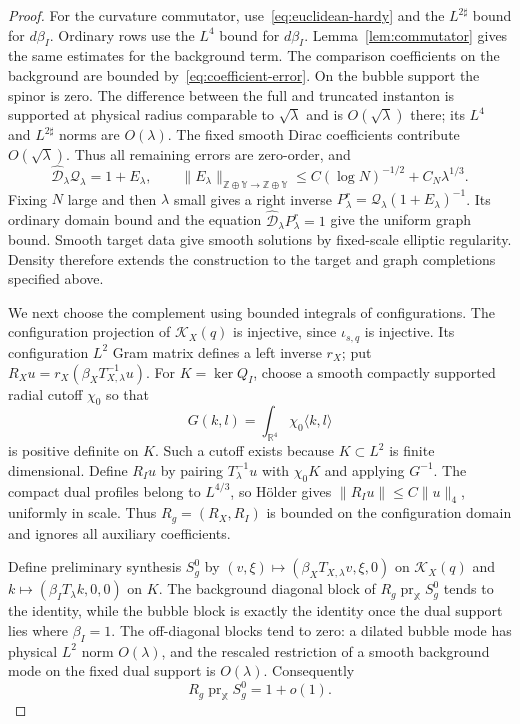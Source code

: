 \documentclass[11pt]{amsart}
\theoremstyle{definition}
\theoremstyle{remark}
\theoremstyle{plain}
\newcommand{\RR}{\mathbb{R}}
\newcommand{\cK}{\mathcal{K}}
\begin{document}
\begin{proof}
For the curvature commutator, use~\eqref{eq:euclidean-hardy} and
the $L^{2\sharp}$ bound for $d\beta_I$.  Ordinary rows use the
$L^4$ bound for $d\beta_I$.  Lemma~\ref{lem:commutator} gives the
same estimates for the background term.  The comparison coefficients
on the background are bounded by~\eqref{eq:coefficient-error}.
On the bubble support the spinor is zero.  The difference between the
full and truncated instanton is supported at physical radius
comparable to $\sqrt\lambda$ and is $O(\sqrt\lambda)$ there;
its $L^4$ and $L^{2\sharp}$ norms are $O(\lambda)$.
The fixed smooth Dirac coefficients contribute $O(\sqrt\lambda)$.
Thus all remaining errors are zero-order, and
\begin{equation}\label{eq:euclidean-parametrix-error}
 \widehat{\mathscr D}_\lambda\mathcal Q_\lambda=1+E_\lambda,
 \qquad
 \|E_\lambda\|_{\mathbb Z\oplus\mathbb Y\to\mathbb Z\oplus\mathbb Y}
 \leq C(\log N)^{-1/2}+C_N\lambda^{1/3}.
\end{equation}
Fixing $N$ large and then $\lambda$ small gives a right inverse
$P^r_\lambda=\mathcal Q_\lambda(1+E_\lambda)^{-1}$.
Its ordinary domain bound and the equation
$\widehat{\mathscr D}_\lambda P^r_\lambda=1$ give the uniform graph
bound.  Smooth target data give smooth solutions by fixed-scale
elliptic regularity.  Density therefore extends the construction
to the target and graph completions specified above.

We next choose the complement using bounded integrals of configurations.
The configuration projection of $\cK_X(q)$ is injective, since
$\iota_{s,q}$ is injective.  Its configuration $L^2$ Gram matrix
defines a left inverse $r_X$; put
$R_Xu=r_X(\beta_XT_{X,\lambda}^{-1}u)$.
For $K=\ker Q_I$, choose a smooth compactly supported radial cutoff
$\chi_0$ so that
\[
 G(k,l)=\int_{\RR^4}\chi_0\langle k,l\rangle
\]
is positive definite on $K$.  Such a cutoff exists because
$K\subset L^2$ is finite dimensional.  Define $R_Iu$ by pairing
$T_\lambda^{-1}u$ with $\chi_0K$ and applying $G^{-1}$.
The compact dual profiles belong to $L^{4/3}$, so H\"older gives
$\|R_Iu\|\leq C\|u\|_4$, uniformly in scale.  Thus
$R_g=(R_X,R_I)$ is bounded on the configuration domain and ignores
all auxiliary coefficients.

Define preliminary synthesis $S_g^0$ by
$(v,\xi)\mapsto(\beta_XT_{X,\lambda}v,\xi,0)$ on $\cK_X(q)$
and $k\mapsto(\beta_IT_\lambda k,0,0)$ on $K$.
The background diagonal block of $R_g\operatorname{pr}_{\mathbb X}S_g^0$
tends to the identity, while the bubble block is exactly the identity
once the dual support lies where $\beta_I=1$.
The off-diagonal blocks tend to zero: a dilated bubble mode has
physical $L^2$ norm $O(\lambda)$, and the rescaled restriction of a
smooth background mode on the fixed dual support is $O(\lambda)$.
Consequently
\begin{equation}\label{eq:preliminary-kernel-matrix}
 R_g\operatorname{pr}_{\mathbb X}S_g^0=1+o(1).
\end{equation}


\end{proof}
\end{document}
